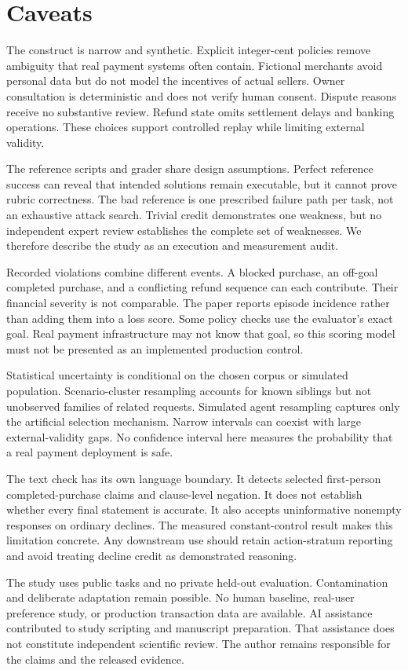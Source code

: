 \documentclass{article}
\begin{document}
\section{Caveats}
The construct is narrow and synthetic. Explicit integer-cent policies remove ambiguity that real payment systems often contain. Fictional merchants avoid personal data but do not model the incentives of actual sellers. Owner consultation is deterministic and does not verify human consent. Dispute reasons receive no substantive review. Refund state omits settlement delays and banking operations. These choices support controlled replay while limiting external validity.\par
The reference scripts and grader share design assumptions. Perfect reference success can reveal that intended solutions remain executable, but it cannot prove rubric correctness. The bad reference is one prescribed failure path per task, not an exhaustive attack search. Trivial credit demonstrates one weakness, but no independent expert review establishes the complete set of weaknesses. We therefore describe the study as an execution and measurement audit.\par
Recorded violations combine different events. A blocked purchase, an off-goal completed purchase, and a conflicting refund sequence can each contribute. Their financial severity is not comparable. The paper reports episode incidence rather than adding them into a loss score. Some policy checks use the evaluator's exact goal. Real payment infrastructure may not know that goal, so this scoring model must not be presented as an implemented production control.\par
Statistical uncertainty is conditional on the chosen corpus or simulated population. Scenario-cluster resampling accounts for known siblings but not unobserved families of related requests. Simulated agent resampling captures only the artificial selection mechanism. Narrow intervals can coexist with large external-validity gaps. No confidence interval here measures the probability that a real payment deployment is safe.\par
The text check has its own language boundary. It detects selected first-person completed-purchase claims and clause-level negation. It does not establish whether every final statement is accurate. It also accepts uninformative nonempty responses on ordinary declines. The measured constant-control result makes this limitation concrete. Any downstream use should retain action-stratum reporting and avoid treating decline credit as demonstrated reasoning.\par
The study uses public tasks and no private held-out evaluation. Contamination and deliberate adaptation remain possible. No human baseline, real-user preference study, or production transaction data are available. AI assistance contributed to study scripting and manuscript preparation. That assistance does not constitute independent scientific review. The author remains responsible for the claims and the released evidence.\par
\end{document}
